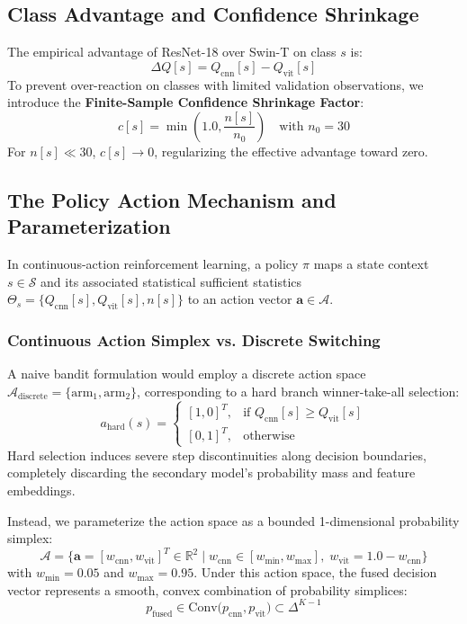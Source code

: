 \documentclass[10pt,journal,compsoc]{IEEEtran}
\begin{document}
\subsection{Class Advantage and Confidence Shrinkage}
The empirical advantage of ResNet-18 over Swin-T on class $s$ is:
\begin{equation}
\Delta Q[s] = Q_{\text{cnn}}[s] - Q_{\text{vit}}[s]
\end{equation}
To prevent over-reaction on classes with limited validation observations, we introduce the \textbf{Finite-Sample Confidence Shrinkage Factor}:
\begin{equation}
c[s] = \min\left(1.0, \frac{n[s]}{n_0}\right) \quad \text{with } n_0 = 30
\end{equation}
For $n[s] \ll 30$, $c[s] \to 0$, regularizing the effective advantage toward zero.

\subsection{The Policy Action Mechanism and Parameterization}
In continuous-action reinforcement learning, a policy $\pi$ maps a state context $s \in \mathcal{S}$ and its associated statistical sufficient statistics $\Theta_s = \{Q_{\text{cnn}}[s], Q_{\text{vit}}[s], n[s]\}$ to an action vector $\mathbf{a} \in \mathcal{A}$.

\subsubsection{Continuous Action Simplex vs. Discrete Switching}
A naive bandit formulation would employ a discrete action space $\mathcal{A}_{\text{discrete}} = \{\text{arm}_1, \text{arm}_2\}$, corresponding to a hard branch winner-take-all selection:
\begin{equation}
a_{\text{hard}}(s) = \begin{cases} [1, 0]^T, & \text{if } Q_{\text{cnn}}[s] \ge Q_{\text{vit}}[s] \\ [0, 1]^T, & \text{otherwise} \end{cases}
\end{equation}
Hard selection induces severe step discontinuities along decision boundaries, completely discarding the secondary model's probability mass and feature embeddings.

Instead, we parameterize the action space as a bounded 1-dimensional probability simplex:
\begin{equation}
\mathcal{A} = \Big\{ \mathbf{a} = [w_{\text{cnn}}, w_{\text{vit}}]^T \in \mathbb{R}^2 \;\Big|\; w_{\text{cnn}} \in [w_{\min}, w_{\max}], \; w_{\text{vit}} = 1.0 - w_{\text{cnn}} \Big\}
\end{equation}
with $w_{\min} = 0.05$ and $w_{\max} = 0.95$. Under this action space, the fused decision vector represents a smooth, convex combination of probability simplices:
\begin{equation}
p_{\text{fused}} \in \text{Conv}\big(p_{\text{cnn}}, p_{\text{vit}}\big) \subset \Delta^{K-1}
\end{equation}
\end{document}
